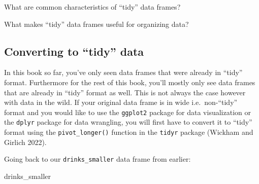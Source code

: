 \documentclass[
  letterpaper,
  DIV=11,
  numbers=noendperiod]{scrreprt}
\newenvironment{Shaded}{\begin{snugshade}}{\end{snugshade}}
\newcommand{\NormalTok}[1]{\textcolor[rgb]{0.00,0.23,0.31}{#1}}
\theoremstyle{definition}
\theoremstyle{remark}
\begin{document}
\begin{tcolorbox}[enhanced jigsaw, colback=white, toprule=.15mm, bottomrule=.15mm, titlerule=0mm, title={{🎯} Learning Check 4.1}, leftrule=.75mm, arc=.35mm, left=2mm, colframe=quarto-callout-tip-color-frame, coltitle=black, opacitybacktitle=0.6, bottomtitle=1mm, colbacktitle=quarto-callout-tip-color!10!white, opacityback=0, toptitle=1mm, rightrule=.15mm, breakable]

What are common characteristics of ``tidy'' data frames?

\end{tcolorbox}

\begin{tcolorbox}[enhanced jigsaw, colback=white, toprule=.15mm, bottomrule=.15mm, titlerule=0mm, title={{🎯} Learning Check 4.2}, leftrule=.75mm, arc=.35mm, left=2mm, colframe=quarto-callout-tip-color-frame, coltitle=black, opacitybacktitle=0.6, bottomtitle=1mm, colbacktitle=quarto-callout-tip-color!10!white, opacityback=0, toptitle=1mm, rightrule=.15mm, breakable]

What makes ``tidy'' data frames useful for organizing data?

\end{tcolorbox}

\hypertarget{converting-to-tidy-data}{%
\subsection{Converting to ``tidy'' data}\label{converting-to-tidy-data}}

In this book so far, you've only seen data frames that were already in
``tidy'' format. Furthermore for the rest of this book, you'll mostly
only see data frames that are already in ``tidy'' format as well. This
is not always the case however with data in the wild. If your original
data frame is in wide i.e.~non-``tidy'' format and you would like to use
the \texttt{ggplot2} package for data visualization or the
\texttt{dplyr} package for data wrangling, you will first have to
convert it to ``tidy'' format using the \texttt{pivot\_longer()}
function in the \texttt{tidyr} package (Wickham and Girlich 2022).

Going back to our \texttt{drinks\_smaller} data frame from earlier:

\begin{Shaded}
\begin{Highlighting}[]
\NormalTok{drinks\_smaller}
\end{Highlighting}
\end{Shaded}
\end{document}

